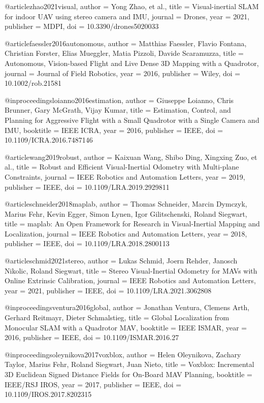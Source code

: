 @article{zhao2021visual,
  author = {Yong Zhao, et al.},
  title = {Visual-inertial SLAM for indoor UAV using stereo camera and IMU},
  journal = {Drones},
  year = {2021},
  publisher = {MDPI},
  doi = {10.3390/drones5020033}
}

@article{faessler2016autonomous,
  author = {Matthias Faessler, Flavio Fontana, Christian Forster, Elias Mueggler, Matia Pizzoli, Davide Scaramuzza},
  title = {Autonomous, Vision-based Flight and Live Dense 3D Mapping with a Quadrotor},
  journal = {Journal of Field Robotics},
  year = {2016},
  publisher = {Wiley},
  doi = {10.1002/rob.21581}
}

@inproceedings{loianno2016estimation,
  author = {Giuseppe Loianno, Chris Brunner, Gary McGrath, Vijay Kumar},
  title = {Estimation, Control, and Planning for Aggressive Flight with a Small Quadrotor with a Single Camera and IMU},
  booktitle = {IEEE ICRA},
  year = {2016},
  publisher = {IEEE},
  doi = {10.1109/ICRA.2016.7487146}
}

@article{wang2019robust,
  author = {Kaixuan Wang, Shibo Ding, Xingxing Zuo, et al.},
  title = {Robust and Efficient Visual-Inertial Odometry with Multi-plane Constraints},
  journal = {IEEE Robotics and Automation Letters},
  year = {2019},
  publisher = {IEEE},
  doi = {10.1109/LRA.2019.2929811}
}

@article{schneider2018maplab,
  author = {Thomas Schneider, Marcin Dymczyk, Marius Fehr, Kevin Egger, Simon Lynen, Igor Gilitschenski, Roland Siegwart},
  title = {maplab: An Open Framework for Research in Visual-Inertial Mapping and Localization},
  journal = {IEEE Robotics and Automation Letters},
  year = {2018},
  publisher = {IEEE},
  doi = {10.1109/LRA.2018.2800113}
}

@article{schmid2021stereo,
  author = {Lukas Schmid, Joern Rehder, Janosch Nikolic, Roland Siegwart},
  title = {Stereo Visual-Inertial Odometry for MAVs with Online Extrinsic Calibration},
  journal = {IEEE Robotics and Automation Letters},
  year = {2021},
  publisher = {IEEE},
  doi = {10.1109/LRA.2021.3062808}
}

@inproceedings{ventura2016global,
  author = {Jonathan Ventura, Clemens Arth, Gerhard Reitmayr, Dieter Schmalstieg},
  title = {Global Localization from Monocular SLAM with a Quadrotor MAV},
  booktitle = {IEEE ISMAR},
  year = {2016},
  publisher = {IEEE},
  doi = {10.1109/ISMAR.2016.27}
}

@inproceedings{oleynikova2017voxblox,
  author = {Helen Oleynikova, Zachary Taylor, Marius Fehr, Roland Siegwart, Juan Nieto},
  title = {Voxblox: Incremental 3D Euclidean Signed Distance Fields for On-Board MAV Planning},
  booktitle = {IEEE/RSJ IROS},
  year = {2017},
  publisher = {IEEE},
  doi = {10.1109/IROS.2017.8202315}
}

